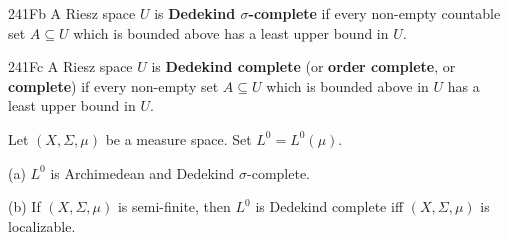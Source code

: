 \spheader 241Fb A Riesz space $U$ is {\bf Dedekind
$\sigma$-complete} if every non-empty countable set $A\subseteq U$
which is bounded above has a least upper bound in $U$.

\spheader 241Fc A Riesz space $U$ is {\bf Dedekind complete} (or
{\bf order complete}, or {\bf complete}) if every
non-empty set $A\subseteq U$ which is bounded above in $U$ has a least
upper bound in $U$.

 Let $(X,\Sigma,\mu)$ be a measure space.   Set
$L^0=L^0(\mu)$.

(a) $L^0$ is Archimedean and Dedekind $\sigma$-complete.

(b) If $(X,\Sigma,\mu)$ is
semi-finite, then $L^0$ is Dedekind complete iff $(X,\Sigma,\mu)$ is
localizable.

